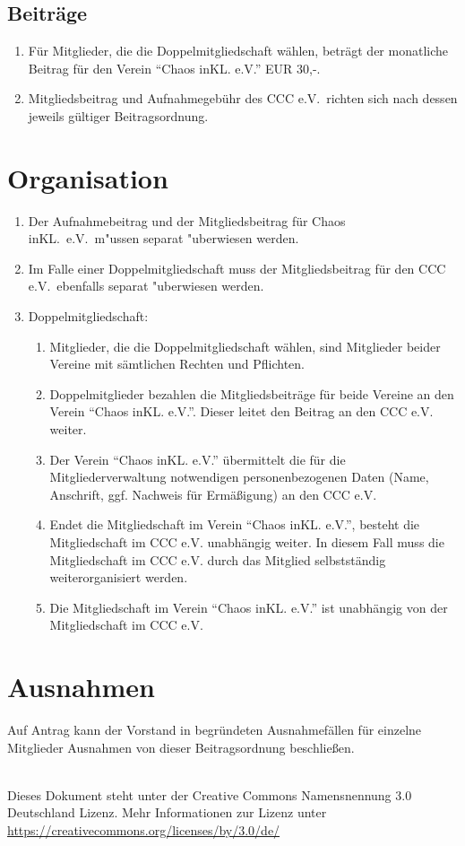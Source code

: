 \documentclass[a4paper, 12pt]{scrartcl}
\begin{document}
\subsection{Beiträge}\label{dmbeitrag}
\begin{enumerate}
	\item \label{dmbeitragbetrag}Für Mitglieder, die die Doppelmitgliedschaft wählen, beträgt der monatliche Beitrag für den Verein "`Chaos inKL. e.V."' EUR 30,-.
	\item Mitgliedsbeitrag und Aufnahmegebühr des CCC e.V.\ richten sich nach dessen jeweils gültiger Beitragsordnung.
\end{enumerate}

\section{Organisation}
\begin{enumerate}
	\item Der Aufnahmebeitrag und der Mitgliedsbeitrag für Chaos inKL.\ e.V.\ m"ussen separat "uberwiesen werden.
	\item Im Falle einer Doppelmitgliedschaft muss der Mitgliedsbeitrag für den CCC e.V.\ ebenfalls separat "uberwiesen werden.
	\item Doppelmitgliedschaft:
\begin{enumerate}
	\item Mitglieder, die die Doppelmitgliedschaft wählen, sind Mitglieder beider Vereine mit sämtlichen Rechten und Pflichten.
	\item Doppelmitglieder bezahlen die Mitgliedsbeiträge für beide Vereine an den Verein "`Chaos inKL. e.V."'. Dieser leitet den Beitrag an den CCC e.V. weiter.
	\item Der Verein "`Chaos inKL. e.V."' übermittelt die für die Mitgliederverwaltung notwendigen personenbezogenen Daten (Name, Anschrift, ggf. Nachweis für Ermäßigung) an den CCC e.V.
	\item Endet die Mitgliedschaft im Verein "`Chaos inKL. e.V."', besteht die Mitgliedschaft im CCC e.V. unabhängig weiter. In diesem Fall muss die Mitgliedschaft im CCC e.V. durch das Mitglied selbstständig weiterorganisiert werden.
	\item Die Mitgliedschaft im Verein "`Chaos inKL. e.V."' ist unabhängig von der Mitgliedschaft im CCC e.V.
\end{enumerate}
\end{enumerate}

\section{Ausnahmen}
Auf Antrag kann der Vorstand in begründeten Ausnahmefällen für einzelne Mitglieder Ausnahmen von dieser Beitragsordnung beschließen.

\vfill

\begin{flushright}
	\ccby \\
	{\small
		Dieses Dokument steht unter der Creative Commons Namensnennung 3.0 Deutschland Lizenz. Mehr Informationen zur Lizenz unter \url{https://creativecommons.org/licenses/by/3.0/de/}
	}
\end{flushright}
\end{document}
